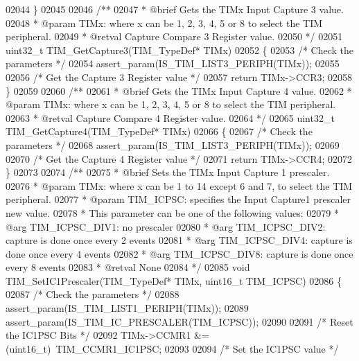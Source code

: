\begin{DoxyCode}
02044 \}
02045 
02046 \textcolor{comment}{/**}
02047 \textcolor{comment}{  * @brief  Gets the TIMx Input Capture 3 value.}
02048 \textcolor{comment}{  * @param  TIMx: where x can be 1, 2, 3, 4, 5 or 8 to select the TIM peripheral.}
02049 \textcolor{comment}{  * @retval Capture Compare 3 Register value.}
02050 \textcolor{comment}{  */}
02051 uint32\_t TIM_GetCapture3(TIM\_TypeDef* TIMx)
02052 \{
02053   \textcolor{comment}{/* Check the parameters */}
02054   assert_param(IS\_TIM\_LIST3\_PERIPH(TIMx));
02055 
02056   \textcolor{comment}{/* Get the Capture 3 Register value */}
02057   \textcolor{keywordflow}{return} TIMx->CCR3;
02058 \}
02059 
02060 \textcolor{comment}{/**}
02061 \textcolor{comment}{  * @brief  Gets the TIMx Input Capture 4 value.}
02062 \textcolor{comment}{  * @param  TIMx: where x can be 1, 2, 3, 4, 5 or 8 to select the TIM peripheral.}
02063 \textcolor{comment}{  * @retval Capture Compare 4 Register value.}
02064 \textcolor{comment}{  */}
02065 uint32\_t TIM_GetCapture4(TIM\_TypeDef* TIMx)
02066 \{
02067   \textcolor{comment}{/* Check the parameters */}
02068   assert_param(IS\_TIM\_LIST3\_PERIPH(TIMx));
02069 
02070   \textcolor{comment}{/* Get the Capture 4 Register value */}
02071   \textcolor{keywordflow}{return} TIMx->CCR4;
02072 \}
02073 
02074 \textcolor{comment}{/**}
02075 \textcolor{comment}{  * @brief  Sets the TIMx Input Capture 1 prescaler.}
02076 \textcolor{comment}{  * @param  TIMx: where x can be 1 to 14 except 6 and 7, to select the TIM peripheral.}
02077 \textcolor{comment}{  * @param  TIM\_ICPSC: specifies the Input Capture1 prescaler new value.}
02078 \textcolor{comment}{  *          This parameter can be one of the following values:}
02079 \textcolor{comment}{  *            @arg TIM\_ICPSC\_DIV1: no prescaler}
02080 \textcolor{comment}{  *            @arg TIM\_ICPSC\_DIV2: capture is done once every 2 events}
02081 \textcolor{comment}{  *            @arg TIM\_ICPSC\_DIV4: capture is done once every 4 events}
02082 \textcolor{comment}{  *            @arg TIM\_ICPSC\_DIV8: capture is done once every 8 events}
02083 \textcolor{comment}{  * @retval None}
02084 \textcolor{comment}{  */}
02085 \textcolor{keywordtype}{void} TIM_SetIC1Prescaler(TIM\_TypeDef* TIMx, uint16\_t TIM\_ICPSC)
02086 \{
02087   \textcolor{comment}{/* Check the parameters */}
02088   assert_param(IS\_TIM\_LIST1\_PERIPH(TIMx));
02089   assert_param(IS\_TIM\_IC\_PRESCALER(TIM\_ICPSC));
02090 
02091   \textcolor{comment}{/* Reset the IC1PSC Bits */}
02092   TIMx->CCMR1 &= (uint16\_t)~TIM_CCMR1_IC1PSC;
02093 
02094   \textcolor{comment}{/* Set the IC1PSC value */}

\end{DoxyCode}
